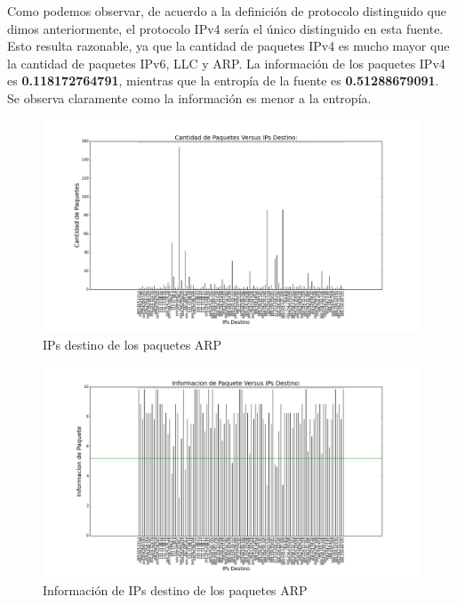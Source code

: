 Como podemos observar, de acuerdo a la definición de protocolo distinguido que dimos anteriormente, el protocolo IPv4 sería el único distinguido en esta fuente. Esto resulta razonable, ya que la cantidad de paquetes IPv4 es mucho mayor que la cantidad de paquetes IPv6, LLC y ARP. La información de los paquetes IPv4 es \textbf{0.118172764791}, mientras que la entropía de la fuente es \textbf{0.51288679091}. Se observa claramente como la información es menor a la entropía.

\begin{figure}[H]
       \centering
       \includegraphics[width=1\textwidth]{../resultados/McDonalds/histogram_dst.png}
       \caption{IPs destino de los paquetes ARP}
       \label{red-hogarena-arp-destination}
\end{figure}

\begin{figure}[H]
       \centering
       \includegraphics[width=1\textwidth]{../resultados/McDonalds/histogram_dst_information.png}
       \caption{Información de IPs destino de los paquetes ARP}
       \label{red-hogarena-arp-destination-info}
\end{figure}

